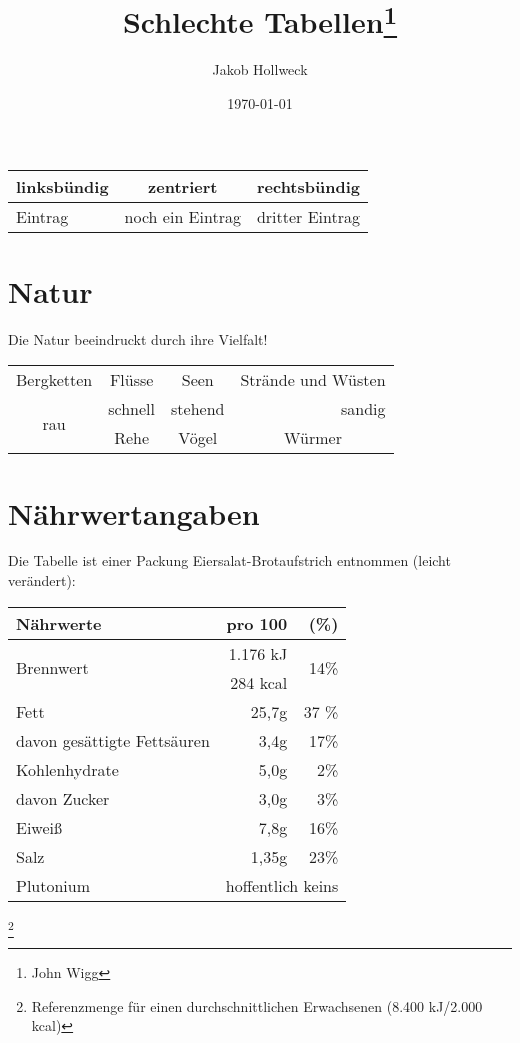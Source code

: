 \documentclass[a4paper, 10pt,onecolumn]{scrartcl}
\title{Schlechte Tabellen\thanks{John Wigg}}
\author{Jakob Hollweck} %
\date{\today}
\begin{document}
\tableofcontents
\maketitle

\begin{tabular}{l|cr}
	linksbündig & zentriert & rechtsbündig\\
	\hline
	Eintrag & noch ein Eintrag & dritter Eintrag
\end{tabular}

\section{Natur}
Die Natur beeindruckt durch ihre Vielfalt!\\

\begin{center}
	\begin{tabular}{|c|c|c|c|}
		\hline
		Bergketten & Flüsse & Seen & Strände und Wüsten\\
		\cline{1-3}
		\multirow{2}{*}{rau}   &  schnell & stehend & \multicolumn{1}{|r|}{sandig}       \\
		\cline{2-4}
		& Rehe & Vögel & Würmer\\
		\hline
	\end{tabular}
\end{center}

\section{Nährwertangaben}
Die Tabelle ist einer Packung Eiersalat-Brotaufstrich entnommen (leicht verändert):

\begin{center}
\begin{tabular}{|l|r|r|}
	\hline
	\textbf{Nährwerte} & \textbf{pro 100} & \textbf{(\%)}\footnotemark[1]\\
	\hline
	\multirow{2}{*}{Brennwert} & 1.176 kJ & \multirow{2}{*}{14\%} \\
	& 284 kcal & \\
	\hline 
	Fett & 25,7g & 37 \% \\
	davon gesättigte Fettsäuren & 3,4g & 17\% \\
	\hline
	Kohlenhydrate & 5,0g & 2\% \\
	davon Zucker & 3,0g & 3\% \\
	\hline
	Eiweiß & 7,8g & 16\% \\
	\hline
	Salz & 1,35g & 23\%\\ \hline
	Plutonium & \multicolumn{2}{c|}{hoffentlich keins}\\
	\hline

\end{tabular}
\end{center}
\footnote{Referenzmenge für einen durchschnittlichen Erwachsenen (8.400 kJ/2.000 kcal)}
\end{document}
